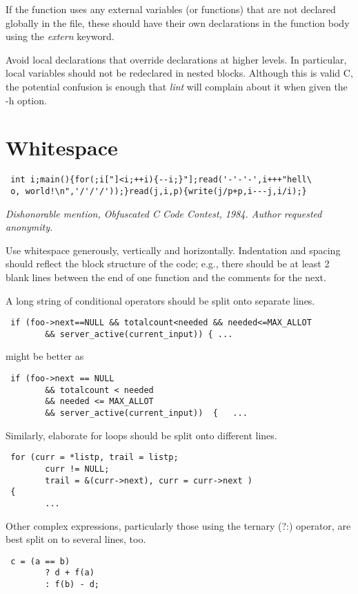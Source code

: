  If the function uses any external variables (or functions) that are not
declared globally in the file, these should have their own declarations in the
function body using the {\em extern} keyword. 

 Avoid local declarations that override declarations at higher levels. In
particular, local variables should not be redeclared in nested blocks. Although
this is valid C, the potential confusion is enough that {\em lint} will complain
about it when given the -h option.

\section{Whitespace}
\begin{verbatim}
 int i;main(){for(;i["]<i;++i){--i;}"];read('-'-'-',i+++"hell\
 o, world!\n",'/'/'/'));}read(j,i,p){write(j/p+p,i---j,i/i);}
\end{verbatim}
{\em Dishonorable mention, Obfuscated C Code Contest, 1984.  Author requested
anonymity.}

 \bigskip\noindent
 Use whitespace generously, vertically and horizontally. Indentation and
spacing should reflect the block structure of the code; e.g., there should be
at least 2 blank lines between the end of one function and the comments for the
next. 

 A long string of conditional operators should be split onto separate lines. 
\begin{verbatim}
 if (foo->next==NULL && totalcount<needed && needed<=MAX_ALLOT
        && server_active(current_input)) { ... 
\end{verbatim}
might be better as 
\begin{verbatim}
 if (foo->next == NULL
        && totalcount < needed
        && needed <= MAX_ALLOT
        && server_active(current_input))  {   ... 
\end{verbatim}
Similarly, elaborate for loops should be split onto different lines. 
\begin{verbatim}
 for (curr = *listp, trail = listp;
        curr != NULL;
        trail = &(curr->next), curr = curr->next )
 {
        ... 
\end{verbatim}

Other complex expressions, particularly those using the ternary (?:) operator,
are best split on to several lines, too. 
\begin{verbatim}
 c = (a == b)
        ? d + f(a)
        : f(b) - d; 
\end{verbatim}
\newpage
